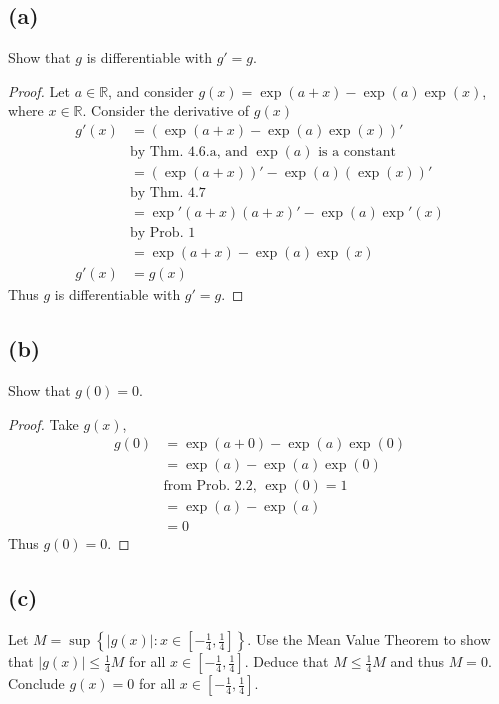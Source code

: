 \documentclass[12pt]{amsart}
\newcommand{\prob}[1]{Prob. #1}
\newcommand{\thm}[1]{Thm. #1}
\newcommand{\R}{\mathbb{R}}
\begin{document}
\subsection*{(a)}%
\label{sub:_a_}

Show that $g$ is differentiable with $g'=g$.

\begin{proof}
  Let $a\in\R$, and consider $g(x)=\exp(a+x)-\exp(a)\exp(x)$, where $x\in\R$.
  Consider the derivative of $g(x)$
  \begin{align*}
    g'(x)&=(\exp(a+x)-\exp(a)\exp(x))'\\
         &\text{by \thm{4.6.a}, and $\exp(a)$ is a constant}\\
         &=(\exp(a+x))'-\exp(a)(\exp(x))'\\
         &\text{by \thm{4.7}}\\
         &=\exp'(a+x)(a+x)'-\exp(a)\exp'(x)\\
         &\text{by \prob{1}}\\
         &=\exp(a+x)-\exp(a)\exp(x)\\
    g'(x)&=g(x)
  \end{align*}
  Thus $g$ is differentiable with $g'=g$.
\end{proof}

\subsection*{(b)}%
\label{sub:_b_}

Show that $g(0)=0$.

\begin{proof}
  Take $g(x)$,
  \begin{align*}
    g(0)&=\exp(a+0)-\exp(a)\exp(0)\\
        &=\exp(a)-\exp(a)\exp(0)\\
        &\text{from \prob{2.2}, $\exp(0)=1$}\\
        &=\exp(a)-\exp(a)\\
        &=0
  \end{align*}
  Thus $g(0)=0$.
\end{proof}

\subsection*{(c)}%
\label{sub:_c_}

Let $M=\sup\left\{|g(x)|:x\in\left[-\frac{1}{4},\frac{1}{4}\right]\right\}$.
Use the Mean Value Theorem to show that $|g(x)|\leq\frac{1}{4}M$ for all
$x\in\left[-\frac{1}{4},\frac{1}{4}\right]$. Deduce that $M\leq\frac{1}{4}M$
and thus $M=0$. Conclude $g(x)=0$ for all
$x\in\left[-\frac{1}{4},\frac{1}{4}\right]$.
\end{document}
